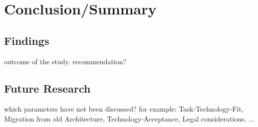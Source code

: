 \chapter{Conclusion/Summary}


\section{Findings}

outcome of the study. recommendation?


\section{Future Research}

which parameters have not been discussed? for example: Task-Technology-Fit, Migration from old Architecture, Technology-Acceptance, Legal considerations, ...
